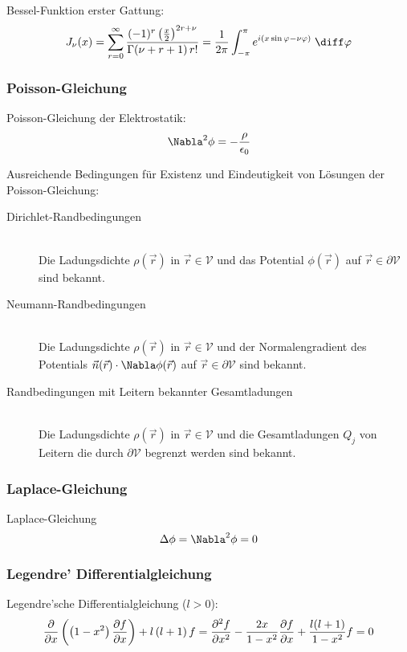 \documentclass[11pt]{article}
\numberwithin{equation}{section}
\begin{document}
        Bessel-Funktion erster Gattung:
        \begin{equation}
          J_\nu(x) = \sum_{r=0}^\infty \frac{(-1)^r\left(\frac{x}{2}\right)^{2r+\nu}}{\Gamma(\nu+r+1)\,r!} = \frac{1}{2\pi}\int_{-\pi}^{\pi} e^{i(x\sin\varphi-\nu\varphi)}\;\diff\varphi
        \end{equation}

      \subsubsection{Poisson-Gleichung}
        Poisson-Gleichung der Elektrostatik:
        \begin{equation}
          \Nabla^2\phi = -\frac{\rho}{\epsilon_0}
        \end{equation}

        Ausreichende Bedingungen für Existenz und Eindeutigkeit von Lösungen der Poisson-Gleichung:
        \begin{description}
          \item[Dirichlet-Randbedingungen]\hfill \\
            Die Ladungsdichte $\rho(\vec{r})$ in $\vec{r}\in\mathcal{V}$ und das Potential $\phi(\vec{r})$ auf $\vec{r}\in\partial\mathcal{V}$ sind bekannt.
          \item[Neumann-Randbedingungen]\hfill \\
            Die Ladungsdichte $\rho(\vec{r})$ in $\vec{r}\in\mathcal{V}$ und der Normalengradient des Potentials $\vec{n}(\vec{r})\cdot\Nabla\phi(\vec{r})$ auf $\vec{r}\in\partial\mathcal{V}$ sind bekannt.
          \item[Randbedingungen mit Leitern bekannter Gesamtladungen]\hfill \\
            Die Ladungsdichte $\rho(\vec{r})$ in $\vec{r}\in\mathcal{V}$ und die Gesamtladungen $Q_j$ von Leitern die durch $\partial\mathcal{V}$ begrenzt werden sind bekannt.
        \end{description}

      \subsubsection{Laplace-Gleichung}
        Laplace-Gleichung
        \begin{equation}
          \Delta\phi=\Nabla^2\phi = 0
        \end{equation}

      \subsubsection{Legendre' Differentialgleichung}
        Legendre'sche Differentialgleichung ($l>0$):
        \begin{equation}
          \frac{\partial }{\partial x}\left(\left(1-x^2\right)\frac{\partial f}{\partial x}\right)+l\left(l+1\right)f
          = \frac{\partial^2 f}{\partial x^2} - \frac{2x}{1-x^2}\frac{\partial f}{\partial x} + \frac{l(l+1)}{1-x^2}f = 0
        \end{equation}
\end{document}
